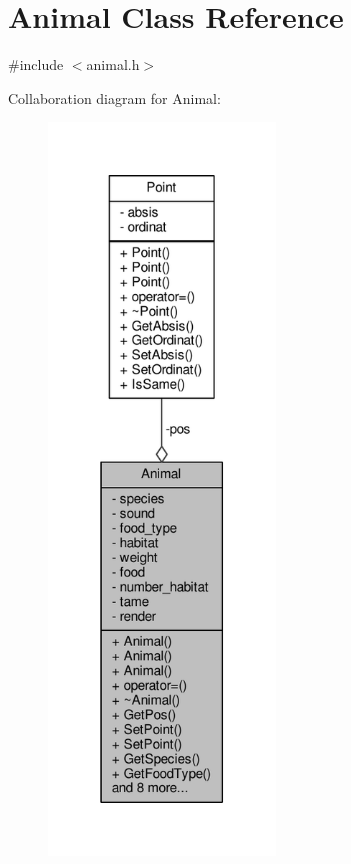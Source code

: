 \hypertarget{classAnimal}{}\section{Animal Class Reference}
\label{classAnimal}


{\ttfamily \#include $<$animal.\+h$>$}



Collaboration diagram for Animal\+:
\nopagebreak
\begin{figure}[H]
\begin{center}
\leavevmode
\includegraphics[height=550pt]{classAnimal__coll__graph}
\end{center}
\end{figure}
